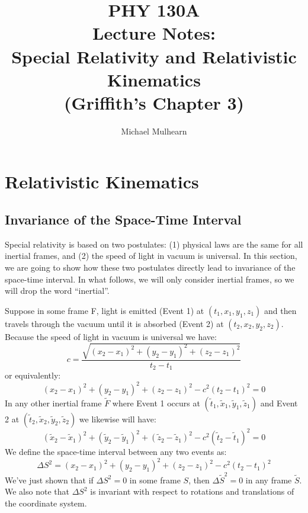 \documentclass[12pt]{book}
\begin{document}
\title{PHY 130A \\ Lecture Notes: \\ 
Special Relativity and Relativistic Kinematics\\
(Griffith's Chapter 3)}
\author{Michael Mulhearn}

\maketitle

\setcounter{chapter}{3}
\chapter{Relativistic Kinematics}

\section{Invariance of the Space-Time Interval}

Special relativity is based on two postulates:  (1) physical laws are the same for all inertial frames, and (2) the speed of light in vacuum is universal.  In this section, we are going to show how these two postulates directly lead to invariance of the space-time interval.  In what follows, we will only consider inertial frames, so we will drop the word ``inertial''.

Suppose in some frame F, light is emitted (Event 1) at $(t_1,x_1,y_1,z_1)$ and then travels through the vacuum until it is absorbed (Event 2) at $(t_2,x_2,y_2,z_2)$.  Because the speed of light in vacuum is universal we have:
$$c = \frac{\sqrt{(x_2-x_1)^2 + (y_2-y_1)^2 + (z_2-z_1)^2}}{t_2-t_1}$$
or equivalently:
$$(x_2-x_1)^2 + (y_2-y_1)^2 + (z_2-z_1)^2 - c^2(t_2-t_1)^2 = 0$$
In any other inertial frame $\widetilde{F}$ where Event 1 occurs at
$(\widetilde{t}_1,\widetilde{x}_1,\widetilde{y}_1,\widetilde{z}_1)$
and Event 2 at $(\widetilde{t}_2,\widetilde{x}_2,\widetilde{y}_2,\widetilde{z}_2)$ we likewise will have:
$$(\widetilde{x}_2-\widetilde{x}_1)^2+(\widetilde{y}_2-\widetilde{y}_1)^2
+(\widetilde{z}_2-\widetilde{z}_1)^2- c^2(\widetilde{t}_2-\widetilde{t}_1)^2 = 0$$
We define the space-time interval between any two events as:
$$\Delta S^2 = (x_2-x_1)^2 + (y_2-y_1)^2 + (z_2-z_1)^2 - c^2(t_2-t_1)^2$$
We've just shown that if $\Delta S^2=0$ in some frame $S$, then $\Delta \widetilde{S}^2=0$
in any frame $\widetilde{S}$.  We also note that $\Delta S^2$ is invariant with respect to rotations and translations of the coordinate system.
\end{document}
